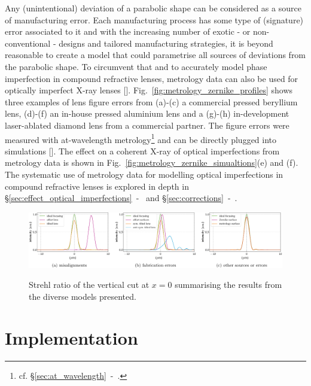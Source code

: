 \begin{refsection}
Any (unintentional) deviation of a parabolic shape can be considered as a source of manufacturing error. Each manufacturing process has some type of (signature) error associated to it and with the increasing number of exotic - or non-conventional - designs and tailored manufacturing strategies, it is beyond reasonable to create a model that could parametrise all sources of deviations from the parabolic shape. To circumvent that and to accurately model phase imperfection in compound refractive lenses, metrology data can also be used for optically imperfect X-ray lenses [\cite{Celestre2020, Chubar2020}]. Fig.~\ref{fig:metrology_zernike_profiles} shows three examples of lens figure errors from (a)-(c) a commercial pressed beryllium lens, (d)-(f) an in-house pressed aluminium lens and a (g)-(h) in-development laser-ablated diamond lens from a commercial partner. The figure errors were measured with at-wavelength metrology\footnote{cf. \S\ref{sec:at_wavelength}~-~\textit{}.} and can be directly plugged into simulations [\cite{Celestre2020}]. The effect on a coherent X-ray of optical imperfections from metrology data is shown in Fig.~\ref{fig:metrology_zernike_simualtions}(e) and (f). The systematic use of metrology data for modelling optical imperfections in compound refractive lenses is explored in depth in \S\ref{sec:effect_optical_imperfections}~-~\textit{} and \S\ref{sec:corrections}~-~\textit{}.

\begin{figure}[t]
        \centering
        {\includegraphics[width=1.\linewidth]{figures/ch04/Strehl}}
        \caption[Strehl ratio summarising the results from the diverse models presented]{Strehl ratio of the vertical cut at $x=0$ summarising the results from the diverse models presented.} \label{fig:Strehl_m}
\end{figure}
\section{Implementation}


\end{refsection}
